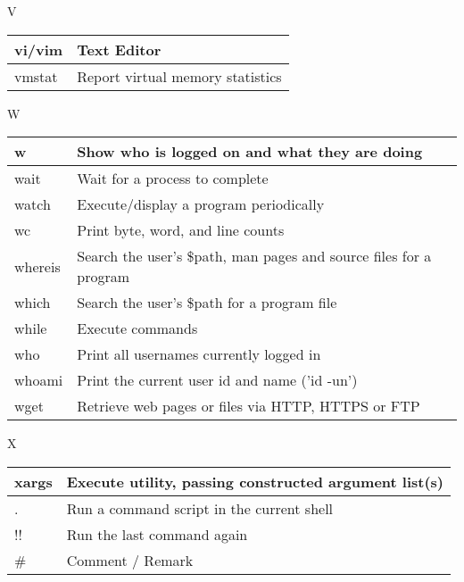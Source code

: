 \begin{flushleft}
\begin{tcolorbox}
	\textsc{V}
\end{tcolorbox}

\begin{tabular}{lp{12cm}}
	\hline
	vi/vim &	Text Editor \\
	\hline
	vmstat &	Report virtual memory statistics \\
	\hline
\end{tabular}

\newpage

\begin{tcolorbox}
	\textsc{W}
\end{tcolorbox}

\begin{tabular}{lp{12cm}}
	\hline
	w &	Show who is logged on and what they are doing \\
	\hline
	wait &	Wait for a process to complete \\
	\hline
	watch &	Execute/display a program periodically \\
	\hline
	wc &	Print byte, word, and line counts \\
	\hline
	whereis &	Search the user's \$path, man pages and source files for a program \\
	\hline
	which &	Search the user's \$path for a program file \\
	\hline
	while &	Execute commands \\
	\hline
	who &	Print all usernames currently logged in \\
	\hline
	whoami &	Print the current user id and name ('id -un') \\
	\hline
	wget &	Retrieve web pages or files via HTTP, HTTPS or FTP \\
	\hline
\end{tabular}



\begin{tcolorbox}
	\textsc{X}
\end{tcolorbox}

\begin{tabular}{lp{12cm}}
	\hline
	xargs &	Execute utility, passing constructed argument list(s) \\
	\hline
	. &	Run a command script in the current shell \\
	\hline
	!! &	Run the last command again \\
	\hline
	\# &	Comment / Remark \\
	\hline
\end{tabular}


\end{flushleft}
\newpage


 